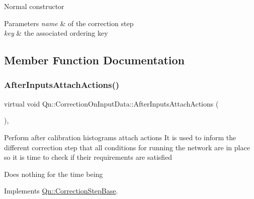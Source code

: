 Normal constructor 
\begin{DoxyParams}{Parameters}
{\em name} & of the correction step \\
\hline
{\em key} & the associated ordering key \\
\hline
\end{DoxyParams}


\subsection{Member Function Documentation}
\mbox{\label{classQn_1_1CorrectionOnInputData_ada5498cdbba9a7697a120f47fd64ae46}} 
\subsubsection{\texorpdfstring{After\+Inputs\+Attach\+Actions()}{AfterInputsAttachActions()}}
{\footnotesize\ttfamily virtual void Qn\+::\+Correction\+On\+Input\+Data\+::\+After\+Inputs\+Attach\+Actions (\begin{DoxyParamCaption}{ }\end{DoxyParamCaption})\hspace{0.3cm}{\ttfamily [inline]}, {\ttfamily [virtual]}}

Perform after calibration histograms attach actions It is used to inform the different correction step that all conditions for running the network are in place so it is time to check if their requirements are satisfied

Does nothing for the time being 

Implements \mbox{\hyperlink{classQn_1_1CorrectionStepBase_a0c32c1fceb1f1be225ef0407a806f9e2}{Qn\+::\+Correction\+Step\+Base}}.

\mbox{\label{classQn_1_1CorrectionOnInputData_adab1d79e0c216c6c981cd8d7ed271490}} 
